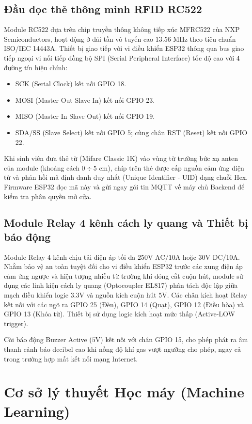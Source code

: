 \subsection{Đầu đọc thẻ thông minh RFID RC522}
Module RC522 dựa trên chip truyền thông không tiếp xúc MFRC522 của NXP Semiconductors, hoạt động ở dải tần vô tuyến cao $13.56\text{ MHz}$ theo tiêu chuẩn ISO/IEC 14443A. Thiết bị giao tiếp với vi điều khiển ESP32 thông qua bus giao tiếp ngoại vi nối tiếp đồng bộ SPI (Serial Peripheral Interface) tốc độ cao với 4 đường tín hiệu chính:
\begin{itemize}
    \item SCK (Serial Clock) kết nối GPIO 18.
    \item MOSI (Master Out Slave In) kết nối GPIO 23.
    \item MISO (Master In Slave Out) kết nối GPIO 19.
    \item SDA/SS (Slave Select) kết nối GPIO 5; cùng chân RST (Reset) kết nối GPIO 22.
\end{itemize}
Khi sinh viên đưa thẻ từ (Mifare Classic 1K) vào vùng từ trường bức xạ anten của module (khoảng cách $0 \div 5\text{ cm}$), chíp trên thẻ được cấp nguồn cảm ứng điện từ và phản hồi mã định danh duy nhất (Unique Identifier - UID) dạng chuỗi Hex. Firmware ESP32 đọc mã này và gửi ngay gói tin MQTT về máy chủ Backend để kiểm tra phân quyền mở cửa.

\subsection{Module Relay 4 kênh cách ly quang và Thiết bị báo động}
Module Relay 4 kênh chịu tải điện áp tối đa $250\text{V AC} / 10\text{A}$ hoặc $30\text{V DC} / 10\text{A}$. Nhằm bảo vệ an toàn tuyệt đối cho vi điều khiển ESP32 trước các xung điện áp cảm ứng ngược và hiện tượng nhiễu từ trường khi đóng cắt cuộn hút, module sử dụng các linh kiện cách ly quang (Optocoupler EL817) phân tách độc lập giữa mạch điều khiển logic $3.3\text{V}$ và nguồn kích cuộn hút $5\text{V}$. Các chân kích hoạt Relay kết nối với các ngõ ra GPIO 25 (Đèn), GPIO 14 (Quạt), GPIO 12 (Điều hòa) và GPIO 13 (Khóa từ). Thiết bị sử dụng logic kích hoạt mức thấp (Active-LOW trigger).

Còi báo động Buzzer Active ($5\text{V}$) kết nối với chân GPIO 15, cho phép phát ra âm thanh cảnh báo decibel cao khi nồng độ khí gas vượt ngưỡng cho phép, ngay cả trong trường hợp mất kết nối mạng Internet.

\section{Cơ sở lý thuyết Học máy (Machine Learning)}
\label{sec:ly_thuyet_hoc_may}

